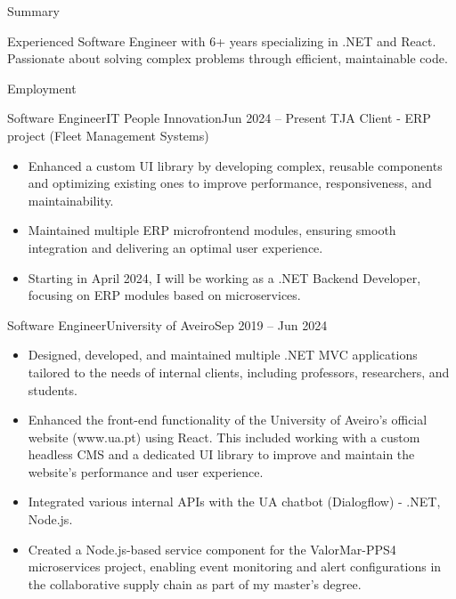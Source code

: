 \documentclass[]{mcdowellcv}
\begin{document}
	\makeheader
	
	\begin{cvsection}{Summary}
		\begin{cvsubsection}{}{}{}
			Experienced Software Engineer with 6+ years specializing in .NET and React. Passionate about solving complex problems through efficient, maintainable code.
		\end{cvsubsection}
	\end{cvsection}

	\begin{cvsection}{Employment}
		\begin{cvsubsection}{Software Engineer}{IT People Innovation}{Jun 2024 -- Present}
			TJA Client - ERP project (Fleet Management Systems)			
			\begin{itemize}
				\item Enhanced a custom UI library by developing complex, reusable components and optimizing existing ones to improve performance, responsiveness, and maintainability.
				\item Maintained multiple ERP microfrontend modules, ensuring smooth integration and delivering an optimal user experience.
				\item Starting in April 2024, I will be working as a .NET Backend Developer, focusing on ERP modules based on microservices.
			\end{itemize}
		\end{cvsubsection}
		
		\begin{cvsubsection}{Software Engineer}{University of Aveiro}{Sep 2019 -- Jun 2024}	
			\begin{itemize}
				\item Designed, developed, and maintained multiple .NET MVC applications tailored to the needs of internal clients, including professors, researchers, and students.
				\item Enhanced the front-end functionality of the University of Aveiro's official website (www.ua.pt) using React. This included working with a custom headless CMS and a dedicated UI library to improve and maintain the website's performance and user experience.
				\item Integrated various internal APIs with the UA chatbot (Dialogflow) - .NET, Node.js.
				\item Created a Node.js-based service component for the ValorMar-PPS4 microservices project, enabling event monitoring and alert configurations in the collaborative supply chain as part of my master's degree.
			\end{itemize}
		\end{cvsubsection}
		

\end{cvsection}
\end{document}
